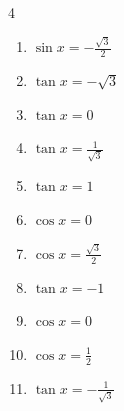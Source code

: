 \begin{multicols}{4}
\begin{enumerate}
  \item $\displaystyle \sin{x}  = -\frac{\sqrt{3}}{2}$


  \item $\displaystyle \tan{x}  = -\sqrt{3}$


\columnbreak %

  \item $\displaystyle \tan{x}  = 0$

        \phantom{$\displaystyle x = 0 , \pi$}

  \item $\displaystyle \tan{x}  = \frac{1}{\sqrt{3}}$


  \item $\displaystyle \tan{x}  = 1$


  \item $\displaystyle \cos{x}  = 0$


  \item $\displaystyle \cos{x}  = \frac{\sqrt{3}}{2}$


  \item $\displaystyle \tan{x}  = -1$


  \item $\displaystyle \cos{x}  = 0$


  \item $\displaystyle \cos{x}  = \frac{1}{2}$


  \item $\displaystyle \tan{x}  = -\frac{1}{\sqrt{3}}$



\end{enumerate}
\end{multicols}

